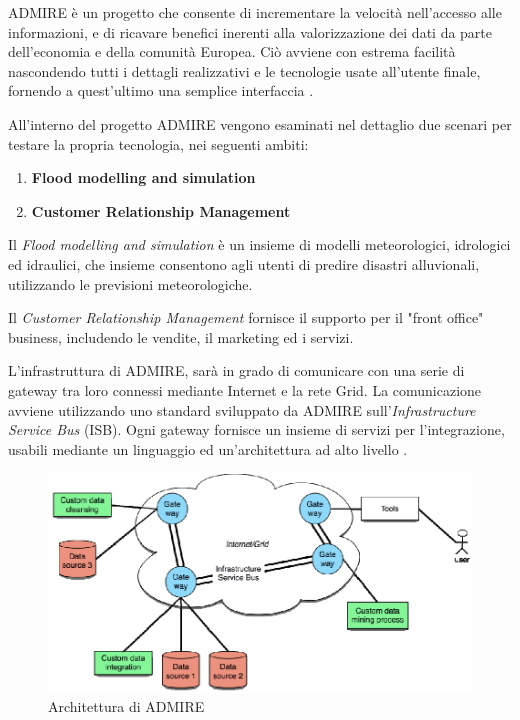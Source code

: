 \documentclass[11pt]{article}
\begin{document}
ADMIRE è un progetto che consente di incrementare la velocità nell'accesso alle informazioni, e di ricavare benefici inerenti alla valorizzazione dei dati da parte dell'economia e della comunità Europea. Ciò avviene con estrema facilità nascondendo tutti i dettagli realizzativi e le tecnologie usate all'utente finale, fornendo a quest'ultimo una semplice interfaccia \cite{6020018}.

All'interno del progetto ADMIRE vengono esaminati nel dettaglio due scenari per testare la propria tecnologia, nei seguenti ambiti:
\begin{enumerate}
	\item \textbf{Flood modelling and simulation}
	\item \textbf{Customer Relationship Management}
\end{enumerate}
Il \emph{Flood modelling and simulation} è un insieme di modelli meteorologici, idrologici ed idraulici, che insieme consentono agli utenti di predire disastri alluvionali, utilizzando le previsioni meteorologiche.

Il \emph{Customer Relationship Management} fornisce il supporto per il "front office" business, includendo le vendite, il marketing ed i servizi.

L'infrastruttura di ADMIRE, sarà in grado di comunicare con una serie di gateway tra loro connessi mediante Internet e la rete Grid. La comunicazione avviene utilizzando uno standard sviluppato da ADMIRE sull'\emph{Infrastructure Service Bus} (ISB). Ogni gateway fornisce un insieme di servizi per l'integrazione, usabili mediante un linguaggio ed un'architettura ad alto livello \cite{6020018}.

\begin{figure}[H]
	\centering
	\includegraphics[scale=0.65]{images/admirearch.png}
	\caption{Architettura di ADMIRE \cite{6020018}}
	\label{admirearch}
\end{figure}
\end{document}

